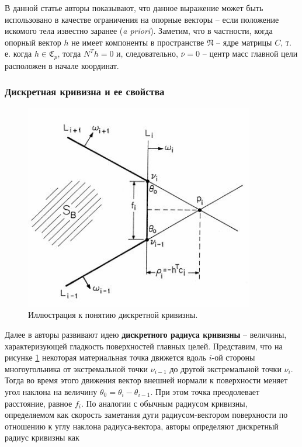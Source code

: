 \documentclass[a4paper, 12pt, titlepage]{article}
\theoremstyle{definition}
\theoremstyle{plain}
\theoremstyle{plain}
\begin{document}
В данной статье авторы показывают, что данное выражение может быть использовано
в качестве ограничения на опорные векторы -- если положение искомого тела
известно заранее (\textit{a priori}). Заметим, что в частности, когда опорный
вектор $h$ не имеет компоненты в пространстве $\mathfrak{N}$ -- ядре матрицы
$C$, т. е. когда $h \in \mathfrak{C}_{p}$, тогда $N^{T} h = 0$ и, следовательно,
$\overline{\nu} = 0$ -- центр масс главной цели расположен в начале координат.

\subsubsection{Дискретная кривизна и ее свойства}
\label{sec:history/PrinceW90/discrete-curvature}

\begin{figure}[ht]
    \includegraphics[width=10cm]{images/dicrete-radius-curvature.jpg}
    \caption{Иллюстрация к понятию дискретной кривизны.}
    \label{dicrete-radius-curvature}
\end{figure}

Далее в авторы развивают идею \textbf{дискретного радиуса кривизны} -- величины,
характеризующей гладкость поверхностей главных целей. Представим, что на
рисунке \ref{dicrete-radius-curvature} некоторая материальная точка движется
вдоль $i$-ой стороны многоугольника от экстремальной точки $\nu_{i - 1}$ до
другой экстремальной точки $\nu_{i}$. Тогда во время этого движения вектор
внешней нормали к поверхности меняет угол наклона на величину
$\theta_{0} = \theta_{i} - \theta_{i - 1}$. При этом точка преодолевает
расстояние, равное $f_{i}$. По аналогии с обычным радиусом кривизны,
определяемом как скорость заметания дуги радиусом-вектором поверхности по
отношению к углу наклона радиуса-вектора, авторы определяют дискретный радиус
кривизны как
\end{document}
